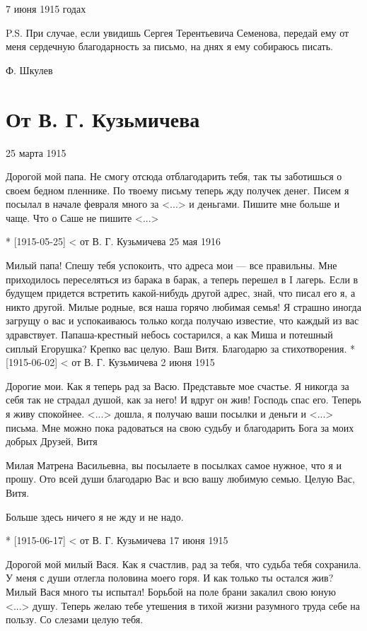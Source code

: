 \documentclass[]{memoir}
\begin{document}
7 июня 1915 годах

P.S. При случае, если увидишь Сергея Терентьевича Семенова, передай ему от меня сердечную благодарность за письмо, на днях я ему собираюсь писать.

Ф. Шкулев

\section{От В. Г. Кузьмичева}

25 марта 1915

Дорогой мой папа. Не смогу отсюда отблагодарить тебя, так ты заботишься о своем бедном пленнике. По твоему письму теперь жду получек денег. Писем я посылал в начале февраля много за <...> и деньгами. Пишите мне больше и чаще. Что о Саше не пишите <...>

* [1915-05-25] < от В. Г. Кузьмичева 
25 мая 1916

Милый папа! Спешу тебя успокоить, что адреса мои — все правильны. Мне приходилось переселяться из барака в барак, а теперь перешел в I лагерь. Если в будущем придется встретить какой-нибудь другой адрес, знай, что писал его я, а никто другой. Милые родные, вся наша горячо любимая семья! Я страшно иногда загрущу о вас и успокаиваюсь только когда получаю известие, что каждый из вас здравствует. Папаша-крестный небось состарился, а как Миша и потешный сиплый Егорушка? Крепко вас целую. Ваш Витя. Благодарю за стихотворения.
* [1915-06-02] < от В. Г. Кузьмичева 
2 июня 1915

Дорогие мои. Как я теперь рад за Васю. Представьте мое счастье. Я никогда за себя так не страдал душой, как за него! И вдруг он жив! Господь спас его. Теперь я живу спокойнее. <...> дошла, я получаю ваши посылки и деньги и <...> письма. Мне можно пока радоваться на свою судьбу и благодарить Бога за моих добрых Друзей, Витя

Милая Матрена Васильевна, вы посылаете в посылках самое нужное, что я и прошу. Ото всей души благодарю Вас и всю вашу любимую семью. Целую Вас, Витя.

Больше здесь ничего я не жду и не надо.

* [1915-06-17] < от В. Г. Кузьмичева 
17 июня 1915

Дорогой мой милый Вася. Как я счастлив, рад за тебя, что судьба тебя сохранила. У меня с души отлегла половина моего горя. И как только ты остался жив? Милый Вася много ты испытал! Борьбой на поле брани закалил свою юную <...> душу. Теперь желаю тебе утешения в тихой жизни разумного труда себе на пользу. Со слезами целую тебя.
\end{document}

